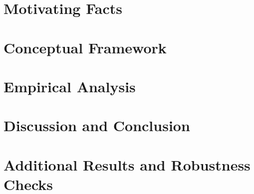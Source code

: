 \documentclass[a4paper,12pt]{article}
\begin{document}
\section{Motivating Facts\label{sec:fact}}


\section{Conceptual Framework\label{sec:concept}}


\section{Empirical Analysis\label{sec:empirical}}



\section{Discussion and Conclusion\label{sec:conclude}}




\newpage

\appendix
\section{Additional Results and Robustness Checks}

\end{document}
